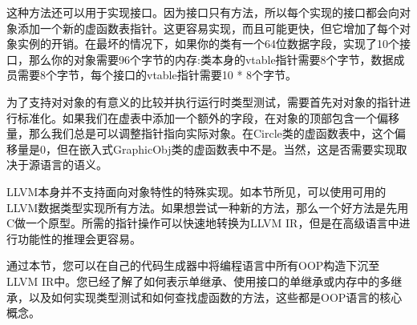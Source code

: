 这种方法还可以用于实现接口。因为接口只有方法，所以每个实现的接口都会向对象添加一个新的虚函数表指针。这更容易实现，而且可能更快，但它增加了每个对象实例的开销。在最坏的情况下，如果你的类有一个64位数据字段，实现了10个接口，那么你的对象需要96个字节的内存:类本身的vtable指针需要8个字节，数据成员需要8个字节，每个接口的vtable指针需要10 * 8个字节。\par

为了支持对对象的有意义的比较并执行运行时类型测试，需要首先对对象的指针进行标准化。如果我们在虚表中添加一个额外的字段，在对象的顶部包含一个偏移量，那么我们总是可以调整指针指向实际对象。在Circle类的虚函数表中，这个偏移量是0，但在嵌入式GraphicObj类的虚函数表中不是。当然，这是否需要实现取决于源语言的语义。\par

LLVM本身并不支持面向对象特性的特殊实现。如本节所见，可以使用可用的LLVM数据类型实现所有方法。如果想尝试一种新的方法，那么一个好方法是先用C做一个原型。所需的指针操作可以快速地转换为LLVM IR，但是在高级语言中进行功能性的推理会更容易。\par

通过本节，您可以在自己的代码生成器中将编程语言中所有OOP构造下沉至LLVM IR中。您已经了解了如何表示单继承、使用接口的单继承或内存中的多继承，以及如何实现类型测试和如何查找虚函数的方法，这些都是OOP语言的核心概念。\par





















